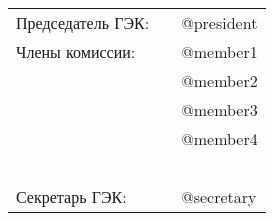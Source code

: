 \documentclass[a4paper,12pt]{article} %
\begin{document}
\begin{center} 	
	\begin{tabular}{lll}
		\vspace{0.3cm}
		Председатель ГЭК:\hspace{1cm} &\makebox[40mm]{\hrulefill} & @president  \\
		Члены комиссии:  \hspace{1cm} &\makebox[40mm]{\hrulefill}\par\medskip & @member1 \\
		
						 \hspace{1cm} &\makebox[40mm]{\hrulefill}\par\medskip & @member2  \\
					   	 \hspace{1cm} &\makebox[40mm]{\hrulefill}\par\medskip & @member3  \\
						 \hspace{1cm} &\makebox[40mm]{\hrulefill}\par\medskip & @member4  \\
		\ \\ %
		\vspace{0.3cm}			
		Секретарь ГЭК:   \hspace{1cm} & \makebox[40mm]{\hrulefill}  & @secretary  \\
	\end{tabular}
\end{center}
\end{document}
